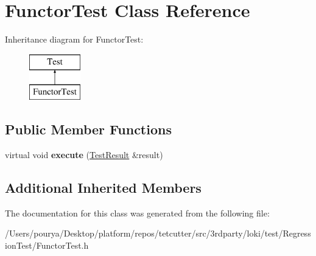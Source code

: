 \hypertarget{classFunctorTest}{}\section{Functor\+Test Class Reference}
\label{classFunctorTest}
Inheritance diagram for Functor\+Test\+:\begin{figure}[H]
\begin{center}
\leavevmode
\includegraphics[height=2.000000cm]{classFunctorTest}
\end{center}
\end{figure}
\subsection*{Public Member Functions}
\begin{DoxyCompactItemize}
\item 
\hypertarget{classFunctorTest_a5d43bd9c46d2115ff56a206f5306abae}{}virtual void {\bfseries execute} (\hyperlink{classTestResult}{Test\+Result} \&result)\label{classFunctorTest_a5d43bd9c46d2115ff56a206f5306abae}

\end{DoxyCompactItemize}
\subsection*{Additional Inherited Members}


The documentation for this class was generated from the following file\+:\begin{DoxyCompactItemize}
\item 
/\+Users/pourya/\+Desktop/platform/repos/tetcutter/src/3rdparty/loki/test/\+Regression\+Test/Functor\+Test.\+h\end{DoxyCompactItemize}
